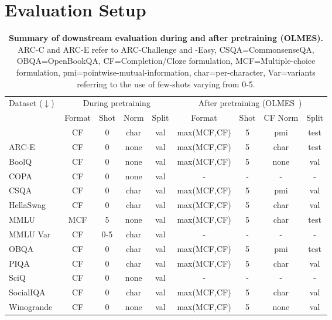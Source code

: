 \documentclass{article}
\begin{document}
\FloatBarrier

\section{Evaluation Setup}
\label{sec:evalsetup}

\begin{table}[htbp]
\centering
\setlength{\tabcolsep}{5.3pt}
\begin{tabular}{l|cccc|cccc}
\toprule
\multirow{3}{*}{Dataset ($\downarrow$)} & \multicolumn{4}{c|}{During pretraining} & \multicolumn{4}{c}{After pretraining (OLMES~\citep{gu2024olmesstandardlanguagemodel})} \\ 
& Format & Shot & Norm & Split & Format & Shot & CF Norm & Split \\ 
\midrule
ARC-C~\citep{clark2018thinksolvedquestionanswering} & CF & 0 & char & val & max(MCF,CF) & 5 & pmi & test \\
ARC-E~\citep{clark2018thinksolvedquestionanswering} & CF & 0 & none & val & max(MCF,CF) & 5 & char & test \\ 
BoolQ~\citep{clark2019boolqexploringsurprisingdifficulty} & CF & 0 & none & val & max(MCF,CF) & 5 & none & val \\
COPA~\citep{gordon2012semeval} & CF & 0 & none & val & - & - & - & - \\
CSQA~\citep{talmor2019commonsenseqaquestionansweringchallenge} & CF & 0 & char & val & max(MCF,CF) & 5 & pmi & val \\
HellaSwag~\citep{zellers2019hellaswagmachinereallyfinish} & CF & 0 & char & val & max(MCF,CF) & 5 & char & val \\
MMLU~\citep{hendrycks2021measuringmassivemultitasklanguage} & MCF & 5 & none & val & max(MCF,CF) & 5 & char & test \\ 
MMLU Var & CF & 0-5 & char & val & - & - & - & - \\
OBQA~\citep{mihaylov2018suitarmorconductelectricity} & CF & 0 & char & val & max(MCF,CF) & 5 & pmi & test \\
PIQA~\citep{bisk2019piqareasoningphysicalcommonsense} & CF & 0 & char & val & max(MCF,CF) & 5 & char & val \\
SciQ~\citep{welbl2017crowdsourcingmultiplechoicescience} & CF & 0 & none & val & - & - & - & - \\ 
SocialIQA~\citep{sap2019socialiqacommonsensereasoningsocial} & CF & 0 & char & val & max(MCF,CF) & 5 & char & val \\
Winogrande~\citep{sakaguchi2019winograndeadversarialwinogradschema} & CF & 0 & none & val & max(MCF,CF) & 5 & none & val \\
\bottomrule
\end{tabular}
\vspace{.5em}
\caption{\textbf{Summary of downstream evaluation during and after pretraining (OLMES).} ARC-C and ARC-E refer to ARC-Challenge and -Easy, CSQA=CommonsenseQA, OBQA=OpenBookQA, CF=Completion/Cloze formulation, MCF=Multiple-choice formulation, pmi=pointwise-mutual-information, char=per-character, Var=variants referring to the use of few-shots varying from 0-5.}
\label{tab:evalsetup}
\end{table}
\end{document}
